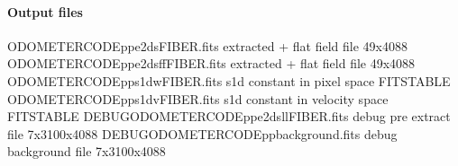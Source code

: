 \documentclass[a4paper,10pt,english]{report}
\begin{document}
\paragraph{Output files}
\label{\detokenize{user/spirou/recipes/wave_master:output-files}}
\begin{sphinxVerbatim}[commandchars=\\\{\}]
ODOMETER\PYGZus{}CODE\PYGZus{}pp\PYGZus{}e2ds\PYGZus{}FIBER.fits               extracted + flat field file 49x4088
ODOMETER\PYGZus{}CODE\PYGZus{}pp\PYGZus{}e2dsff\PYGZus{}FIBER.fits             extracted + flat field file 49x4088
ODOMETER\PYGZus{}CODE\PYGZus{}pp\PYGZus{}s1d\PYGZus{}w\PYGZus{}FIBER.fits              s1d constant in pixel space FITS\PYGZhy{}TABLE
ODOMETER\PYGZus{}CODE\PYGZus{}pp\PYGZus{}s1d\PYGZus{}v\PYGZus{}FIBER.fits              s1d constant in velocity space FITS\PYGZhy{}TABLE
DEBUG\PYGZus{}ODOMETER\PYGZus{}CODE\PYGZus{}pp\PYGZus{}e2dsll\PYGZus{}FIBER.fits       debug pre extract file 7x3100x4088
DEBUG\PYGZus{}ODOMETER\PYGZus{}CODE\PYGZus{}pp\PYGZus{}background.fits           debug background file 7x3100x4088


\end{sphinxVerbatim}
\end{document}
